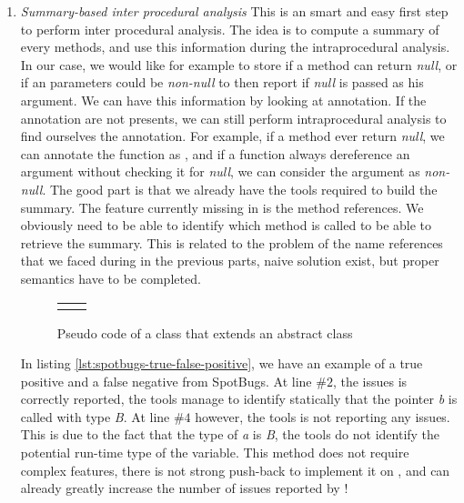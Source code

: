 \begin{enumerate}
	\item \textit{Summary-based inter procedural analysis} \newline
	This is an smart and easy first step to perform inter procedural analysis.
	The idea is to compute a summary of every methods, and use this information during the intraprocedural analysis. 
	In our case, we would like for example to store if a method can return \emph{null}, or if an parameters could be \emph{non-null} to then report if \emph{null} is passed as his argument. 
	We can have this information by looking at annotation. If the annotation are not presents, we can still perform intraprocedural analysis to find ourselves the annotation. For example, if a method ever return \emph{null}, we can annotate the function as \nullable{}, and if a function always dereference an argument without checking it for \emph{null}, we can consider the argument as \emph{non-null}. 
	The good part is that we already have the tools required to build the summary. The feature currently missing in \slang{} is the method references. 
	We obviously need to be able to identify which method is called to be able to retrieve the summary.
	This is related to the problem of the name references that we faced during in the previous parts, naive solution exist, but proper semantics have to be completed.	


\begin{figure}[h]
	\centering
	\caption{Pseudo code of a class that extends an abstract class}
	\label{figure:class-extends-abtract}
	\setlength{\tabcolsep}{24pt}
	\begin{tabular}{cc}
		\multicolumn{1}{c}{} & \multicolumn{1}{c}{} \\
	\end{tabular}
\end{figure}
	
	
	
	In listing \ref{lst:spotbugs-true-false-positive}, we have an example of a true positive and a false negative from SpotBugs. At line $\#2$, the issues is correctly reported, the tools manage to identify statically that the pointer \emph{b} is called with type \emph{B}. At line $\#4$ however, the tools is not reporting any issues. This is due to the fact that the type of \emph{a} is \emph{B}, the tools do not identify the potential run-time type of the variable.\newline
	This method does not require complex features, there is not strong push-back to implement it on \slang{}, and can already greatly increase the number of issues reported by \slang{}!
\end{enumerate}





